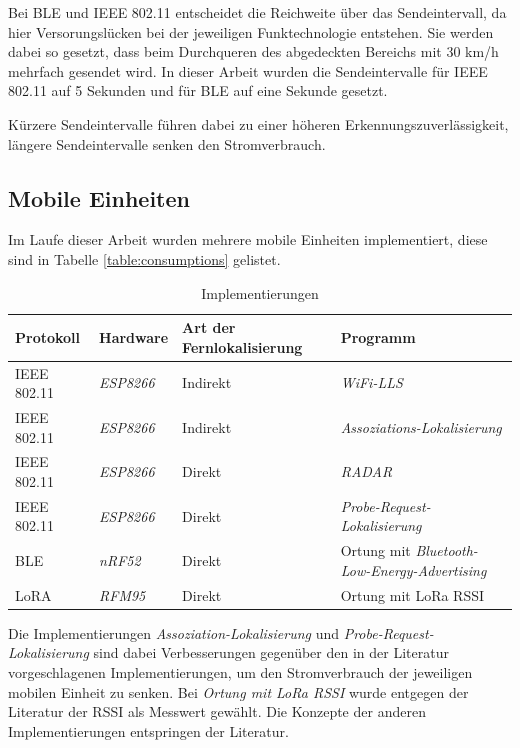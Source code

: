 Bei BLE und IEEE 802.11 entscheidet die Reichweite über das Sendeintervall, da hier Versorungslücken bei der jeweiligen Funktechnologie entstehen.
Sie werden dabei so gesetzt, dass beim Durchqueren des abgedeckten Bereichs mit 30 km/h mehrfach gesendet wird.
In dieser Arbeit wurden die Sendeintervalle für IEEE 802.11 auf 5 Sekunden und für BLE auf eine Sekunde gesetzt.

Kürzere Sendeintervalle führen dabei zu einer höheren Erkennungszuverlässigkeit, längere Sendeintervalle senken den Stromverbrauch.

\subsection{Mobile Einheiten}
Im Laufe dieser Arbeit wurden mehrere mobile Einheiten implementiert, diese sind in Tabelle \ref{table:consumptions} gelistet.

\begin{table}[h]
	\centering
	\caption{Implementierungen}
	\label{table:ranges}
	\begin{tabular}{l|l|p{2.5cm}|p{5.8cm}}
		Protokoll & Hardware & Art der Fernlokalisierung & Programm \\
		\hline
		IEEE 802.11 & \emph{ESP8266} & Indirekt & \emph{WiFi-LLS} \cite{chen2007design} \\
		IEEE 802.11 & \emph{ESP8266} & Indirekt & \emph{Assoziations-Lokalisierung} \\
		\hline
		IEEE 802.11 & \emph{ESP8266} & Direkt & \emph{RADAR} \cite{bahl2000radar} \\
		IEEE 802.11 & \emph{ESP8266} & Direkt & \emph{Probe-Request-Lokalisierung} \\
		\hline
		BLE & \emph{nRF52} & Direkt & Ortung mit \emph{Bluetooth-Low-Energy-Advertising} \cite{jianyong2014rssi} \\
		\hline
		LoRA & \emph{RFM95} & Direkt & Ortung mit LoRa RSSI \\
	\end{tabular}
\end{table}

Die Implementierungen \emph{Assoziation-Lokalisierung} und \emph{Probe-Request-Lokalisierung} sind dabei Verbesserungen gegenüber den in der Literatur vorgeschlagenen Implementierungen, um den Stromverbrauch der jeweiligen mobilen Einheit zu senken.
Bei \emph{Ortung mit LoRa RSSI} wurde entgegen der Literatur der RSSI als Messwert gewählt.
Die Konzepte der anderen Implementierungen entspringen der Literatur.

